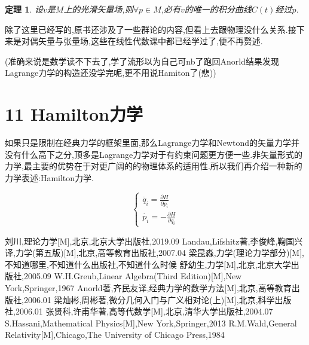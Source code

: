 \documentclass[UTF8]{article}
\begin{document}
	\newtheorem*{uniquenessOfIntegralCurve}{定理}
	
	\begin{uniquenessOfIntegralCurve}
		设$v$是$M$上的光滑矢量场,则$\forall p \in M$,必有$v$的唯一的积分曲线$C(t)$经过$p$.
	\end{uniquenessOfIntegralCurve}
	
	除了这里已经写的,原书还涉及了一些群论的内容,但看上去跟物理没什么关系.接下来是对偶矢量与张量场,这些在线性代数课中都已经学过了,便不再赘述.
	
	(准确来说是数学读不下去了,学了流形以为自己可nb了跑回Anorld结果发现Lagrange力学的构造还没学完呢,更不用说Hamiton了(悲))
	
	
	
	
	
	\newpage
	
	
\section*{11 Hamilton力学}
	
	如果只是限制在经典力学的框架里面,那么Lagrange力学和Newtond的矢量力学并没有什么高下之分,顶多是Lagrange力学对于有约束问题更方便一些.非矢量形式的力学,最主要的优势在于对更广阔的的物理体系的适用性.所以我们再介绍一种新的力学表述:Hamilton力学.
	
	\[\begin{cases}
		\dot{q_{i}} = \frac{\partial H}{\partial p_{i}}\\
		\dot{p_{i}} = -\frac{\partial H}{\partial q_{i}}
	\end{cases}\]
	
	
	
	
	
	
	
	
	
	
	
	\newpage
	
	\begin{thebibliography}{?}
		 刘川,理论力学[M],北京,北京大学出版社,2019.09
		 Landau,Lifshitz著,李俊峰,鞠国兴译,力学(第五版)[M],北京,高等教育出版社,2007.04
		 梁昆淼,力学(理论力学部分)[M],不知道哪里,不知道什么出版社,不知道什么时候
		 舒幼生,力学[M],北京,北京大学出版社,2005.09
		 W.H.Greub,Linear Algebra(Third Edition)[M],New York,Springer,1967
		 Anorld著,齐民友译,经典力学的数学方法[M],北京,高等教育出版社,2006.01
		 梁灿彬,周彬著,微分几何入门与广义相对论(上)[M],北京,科学出版社,2006.01
		 张贤科,许甫华著,高等代数学[M],北京,清华大学出版社,2004.07
		 S.Hassani,Mathematical Physics[M],New York,Springer,2013
		 R.M.Wald,General Relativity[M],Chicago,The University of Chicago Press,1984
	\end{thebibliography}
	
	
	
	
	
	
\end{document}
